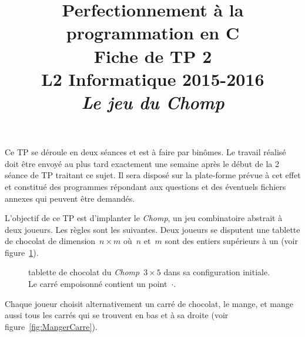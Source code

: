 \documentclass[12pt]{article}
\date{}
\title{{\bf Perfectionnement à la programmation en {\sf C}} \\
    Fiche de TP 2 \\
    {\small L2 Informatique 2015-2016} \\
    {\it \small Le jeu du Chomp}}
\theoremstyle{definition}
\begin{document}
\maketitle

Ce TP se déroule en deux séances et est à faire par binômes. Le travail 
réalisé doit être envoyé au plus tard exactement une semaine après le 
début de la 2\ieme{} séance de TP traitant ce sujet. Il sera disposé sur 
la plate-forme prévue à cet effet et constitué des programmes répondant 
aux questions et des éventuels fichiers annexes qui peuvent être demandés.
\bigskip
\bigskip

L'objectif de ce TP est d'implanter le {\em Chomp}, un jeu combinatoire
abstrait à deux joueurs. Les règles sont les suivantes. Deux joueurs se
disputent une tablette de chocolat de dimension~$n \times m$ où~$n$ et~$m$
sont des entiers supérieurs à un (voir figure~\ref{fig:Chomp3x5}).
\begin{figure}[ht]
    \centering
    \caption{\footnotesize tablette de chocolat du {\em Chomp}~$3 \times 5$
    dans sa configuration initiale. Le carré empoisonné contient un
    point~$\cdot$.}
    \label{fig:Chomp3x5}
\end{figure}
Chaque joueur choisit alternativement un carré de chocolat, le mange, et
mange aussi tous les carrés qui se trouvent en bas et à sa droite
(voir figure~\ref{fig:MangerCarre}).
\end{document}
